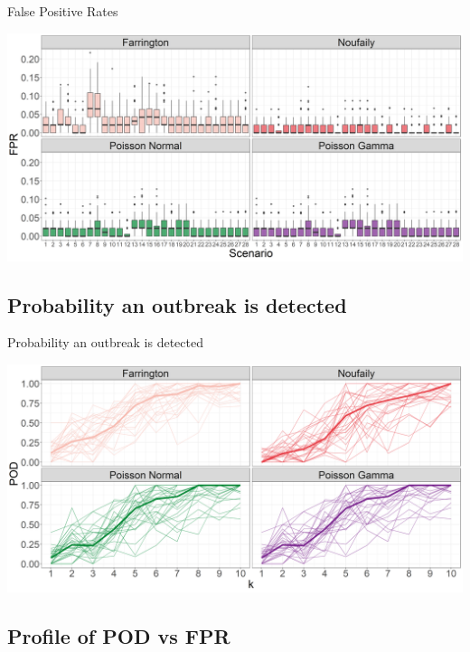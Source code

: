 \documentclass[aspectratio=169]{beamer}
\begin{document}
\begin{frame}{False Positive Rates}
\tiny

\includegraphics[width=1\linewidth]{../figures/FPRPlot}

\normalsize
\end{frame}

\hypertarget{probability-an-outbreak-is-detected}{%
\subsection{Probability an outbreak is
detected}\label{probability-an-outbreak-is-detected}}

\begin{frame}{Probability an outbreak is detected}
\tiny

\includegraphics[width=1\linewidth]{../figures/PropDetect}

\normalsize
\end{frame}

\hypertarget{profile-of-pod-vs-fpr}{%
\subsection{Profile of POD vs FPR}\label{profile-of-pod-vs-fpr}}
\end{document}
